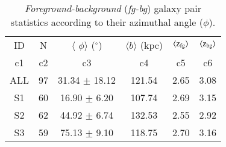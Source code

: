 \documentclass[longauth]{aa}
\begin{document}
\begin{appendix}
\begin{table}[h]
\centering
\caption{\label{tbl:PairsStat-PHI}
\textit{Foreground-background} (\textit{fg-bg}) galaxy pair statistics 
according to their azimuthal angle ($\phi$).}
\begin{tabular}{cccccc}
  \\
  \hline\hline
  \multicolumn{1}{c}{ID} &
  \multicolumn{1}{c}{N} &
  \multicolumn{1}{c}{$\langle$ $\phi \rangle$ ($^{\circ}$)}&
  \multicolumn{1}{c}{$\langle b \rangle$ (kpc)} & 
  \multicolumn{1}{c}{$\langle \rm{z}_{\rm{fg}}\rangle$} &
  \multicolumn{1}{c}{$\langle \rm{z}_{\rm{bg}}\rangle$} \\
  \multicolumn{1}{c}{c1} & 
  \multicolumn{1}{c}{c2} &
  \multicolumn{1}{c}{c3} &
  \multicolumn{1}{c}{c4} &
  \multicolumn{1}{c}{c5} &
  \multicolumn{1}{c}{c6} \\
  \hline\hline  
ALL &  97 & 31.34 $\pm$ 18.12 & 121.54 & 2.65 & 3.08 \\
S1  &  60 & 16.90 $\pm$  6.20 & 107.74 & 2.69 & 3.15 \\
S2  &  62 & 44.92 $\pm$  6.74 & 132.53 & 2.55 & 2.92 \\
S3  &  59 & 75.13 $\pm$  9.10 & 118.75 & 2.70 & 3.16 \\
  \hline\hline
\end{tabular}
\end{table}


\end{appendix}
\end{document}
